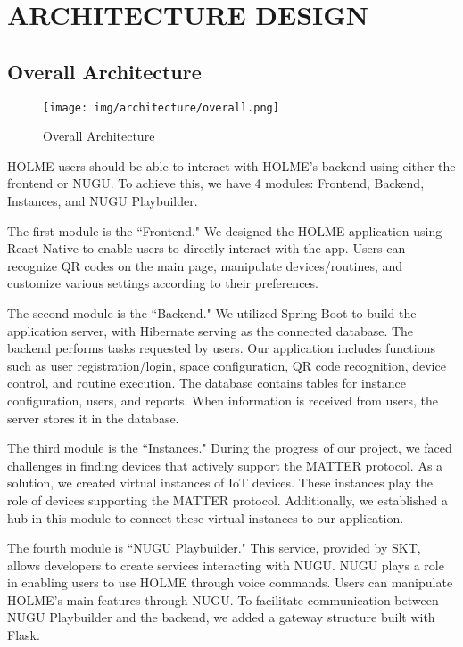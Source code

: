 \documentclass[conference]{IEEEtran}
\begin{document}
\section{ARCHITECTURE DESIGN}
\subsection{Overall Architecture}

\begin{figure}[h]
\centering   
\texttt{[image: img/architecture/overall.png]}
\caption{Overall Architecture}
\end{figure}
\vspace{1cm}
HOLME users should be able to interact with HOLME's backend using either the frontend or NUGU. To achieve this, we have 4 modules: Frontend, Backend, Instances, and NUGU Playbuilder. 

The first module is the ``Frontend."  We designed the HOLME application using React Native to enable users to directly interact with the app. Users can recognize QR codes on the main page, manipulate devices/routines, and customize various settings according to their preferences.

The second module is the ``Backend."  We utilized Spring Boot to build the application server, with Hibernate serving as the connected database. The backend performs tasks requested by users. Our application includes functions such as user registration/login, space configuration, QR code recognition, device control, and routine execution. The database contains tables for instance configuration, users, and reports. When information is received from users, the server stores it in the database.

The third module is the ``Instances." During the progress of our project, we faced challenges in finding devices that actively support the MATTER protocol. As a solution, we created virtual instances of IoT devices. These instances play the role of devices supporting the MATTER protocol. Additionally, we established a hub in this module to connect these virtual instances to our application.

The fourth module is ``NUGU Playbuilder." This service, provided by SKT, allows developers to create services interacting with NUGU. NUGU plays a role in enabling users to use HOLME through voice commands. Users can manipulate HOLME's main features through NUGU. To facilitate communication between NUGU Playbuilder and the backend, we added a gateway structure built with Flask.\\
\end{document}
